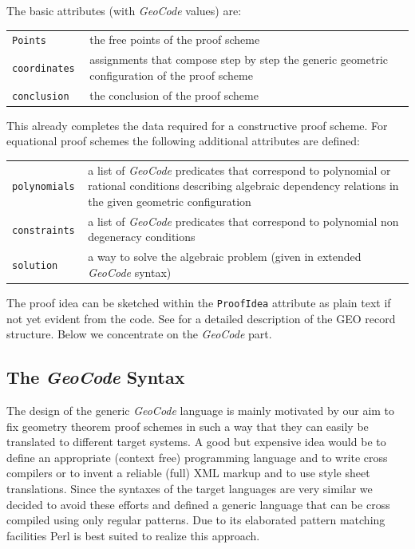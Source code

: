 \documentclass[11pt]{article}
\newcommand{\GC}{\textit{Geo\-Code}}
\begin{document}
The basic attributes (with {\GC} values) are:
\begin{center}
\begin{tabular}{lp{12cm}}
\tt Points & the free points of the proof scheme\\
\tt coordinates & assignments that compose step by step the generic geometric
configuration of the proof scheme\\  
\tt conclusion & the conclusion of the proof scheme\\ 
\end{tabular}
\end{center}
This already completes the data required for a constructive proof scheme.  For
equational proof schemes the following additional attributes are defined:
\begin{center}
\begin{tabular}{lp{12cm}}
\tt polynomials & a list of {\GC} predicates that correspond to polynomial or
rational conditions describing algebraic dependency relations in the given
geometric configuration\\ 
\tt constraints & a list of {\GC} predicates that correspond to polynomial non
degeneracy conditions\\  
\tt solution & a way to solve the algebraic problem (given in extended {\GC}
syntax) 
\end{tabular}
\end{center}
The proof idea can be sketched within the {\tt ProofIdea} attribute as plain
text if not yet evident from the code. See \cite{rwca-02} for a detailed
description of the GEO record structure. Below we concentrate on the {\GC}
part.

\subsection{The {\GC} Syntax}

The design of the generic {\GC} language is mainly motivated by our aim to fix
geometry theorem proof schemes in such a way that they can easily be
translated to different target systems. A good but expensive idea would be to
define an appropriate (context free) programming language and to write cross
compilers or to invent a reliable (full) XML markup and to use style sheet
translations.  Since the syntaxes of the target languages are very similar we
decided to avoid these efforts and defined a generic language that can be
cross compiled using only regular patterns.  Due to its elaborated pattern
matching facilities Perl is best suited to realize this approach.  \medskip
\end{document}
